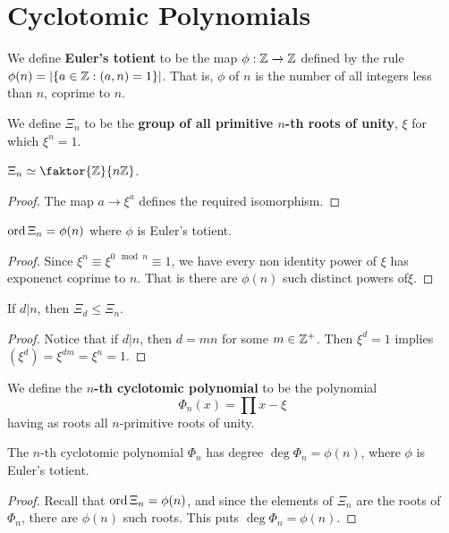\section{Cyclotomic Polynomials}
\label{section_8.7}

\begin{definition}
  We define \textbf{Euler's totient} to be the map $\phi:\mathbb{Z} \xrightarrow{} \mathbb{Z}$
  defined by the rule $\phi(n)=|\{a \in \mathbb{Z} : (a,n)=1\}|$. That is, $\phi$
  of  $n$ is the number of all integers less than  $n$, coprime to  $n$.
\end{definition}

\begin{definition}
  We define $\Xi_n$ to be the \textbf{group of all primitive $n$-th roots of
  unity}, $\xi$ for which  $\xi^n=1$.
\end{definition}

\begin{lemma}\label{lemma_8.7.1}
  $\Xi_n \simeq \faktor{\Z}{n\Z}$.
\end{lemma}
\begin{proof}
  The map $a \xrightarrow{} \xi^a$ defines the required isomorphism.
\end{proof}
\begin{corollary}
  $\operatorname{ord}{\Xi_n}=\phi(n)$ where $\phi$ is Euler's totient.
\end{corollary}
\begin{proof}
  Since $\xi^n \equiv \xi^{0 \mod{n}} \equiv 1$, we have every non identity
  power of $\xi$ has exponenct coprime to  $n$. That is there are $\phi(n)$
  such distinct powers of$\xi$.
\end{proof}
\begin{corollary}
  If $d|n$, then  $\Xi_d \leq \Xi_n$.
\end{corollary}
\begin{proof}
  Notice that if $d|n$, then $d=mn$ for some  $m \in \mathbb{Z}^+$. Then $\xi^d=1$
  implies  $(\xi^d)=\xi^{dm}=\xi^n=1$.
\end{proof}

\begin{definition}
  We define the \textbf{$n$-th cyclotomic polynomial} to be the polynomial
  \begin{equation*}
    \Phi_n(x)=\prod{x-\xi}
  \end{equation*}
  having as roots all $n$-primitive roots of unity.
\end{definition}

\begin{lemma}\label{lemma_8.7.2}
  The $n$-th cyclotomic polynomial  $\Phi_n$ has degree
  $\deg{\Phi_n}=\phi(n)$, where $\phi$ is Euler's totient.
\end{lemma}
\begin{proof}
  Recall that $\operatorname{ord}{\Xi_n}=\phi(n)$, and since the elements of $\Xi_n$ are the
  roots of  $\Phi_n$, there are  $\phi(n)$ such roots. This puts
  $\deg{\Phi_n}=\phi(n)$.
\end{proof}

